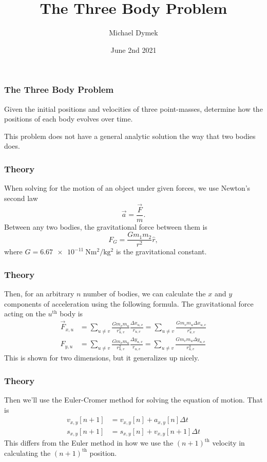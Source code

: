 \documentclass{beamer}
\title{The Three Body Problem}
\author[]{Michael Dymek}
\institute[]{Western Washington University}
\date{June 2nd 2021}
\begin{document}
\begin{frame}
	\titlepage
\end{frame}

\begin{frame}
\frametitle{The Three Body Problem}
Given the initial positions and velocities of three point-masses, determine how the positions of each body evolves over time. \bigskip

This problem does not have a general analytic solution the way that two bodies does.
\end{frame}



\begin{frame}
\frametitle{Theory}
When solving for the motion of an object under given forces, we use Newton's second law
\[ \vec{a} = \frac{\vec{F}}{m}. \]
Between any two bodies, the gravitational force between them is
\begin{equation*}
	F_G = \frac{G m_1 m_2}{r^2}\hat{r},
\end{equation*}
where $G = \SI{6.67e-11}{\newton \meter^2 \per \kilo \gram^2}$ is the gravitational constant.
\end{frame}

\begin{frame}
\frametitle{Theory}
Then, for an arbitrary $n$ number of bodies, we can calculate the $x$ and $y$ components of acceleration using the following formula. The gravitational force acting on the $u^{\text{th}}$ body is
\begin{align*}
	\vec{F}_{x,u} &= \sum_{u \neq v} \frac{G m_v m_u}{r_{u,v}^2} \frac{\Delta x_{u,v}}{r_{u,v}} = \sum_{u \neq v} \frac{G m_v m_u\Delta x_{u,v}}{r_{u,v}^3} \\
	F_{y,u} &= \sum_{u \neq v} \frac{G m_v m_u}{r_{u,v}^2} \frac{\Delta y_{u,v}}{r_{u,v}} = \sum_{u \neq v} \frac{G m_v m_u \Delta y_{u,v}}{r_{u,v}^3}
\end{align*}
This is shown for two dimensions, but it generalizes up nicely.
\end{frame}

\begin{frame}
\frametitle{Theory}
Then we'll use the Euler-Cromer method for solving the equation of motion. That is
\begin{align*}
	v_{x,y}[n+1] &= v_{x,y}[n] + a_{x,y}[n] \Delta t \\
	s_{x,y}[n+1] &= s_{x,y}[n] + v_{x,y}[n+1] \Delta t
\end{align*}
This differs from the Euler method in how we use the $(n+1)^{\text{th}}$ velocity in calculating the $(n+1)^{\text{th}}$ position.
\end{frame}
\end{document}
